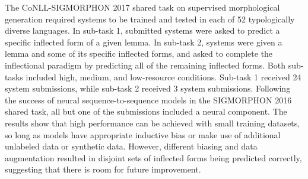 The CoNLL-SIGMORPHON 2017 shared task on supervised morphological generation required systems to be trained and tested in each of 52 typologically diverse languages. In sub-task 1, submitted systems were asked to predict a specific inflected form of a given lemma.  In sub-task 2, systems were given a lemma and some of its specific inflected forms, and asked to complete the inflectional paradigm by predicting all of the remaining inflected forms. Both sub-tasks included high, medium, and low-resource conditions. Sub-task 1 received 24 system submissions, while sub-task 2 received 3 system submissions. Following the success of neural sequence-to-sequence models in the SIGMORPHON 2016 shared task, all but one of the submissions included a neural component. The results show that high performance can be achieved with small training datasets, so long as models have appropriate inductive bias or make use of additional unlabeled data or synthetic data. However, different biasing and data augmentation resulted in disjoint sets of inflected forms being predicted correctly, suggesting that there is room for future improvement.
